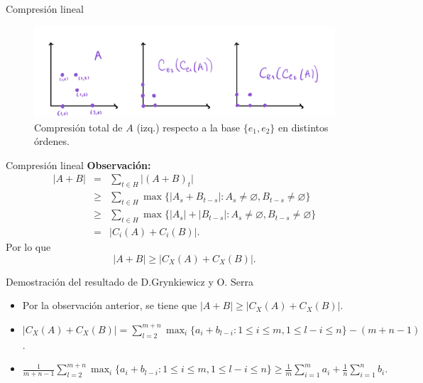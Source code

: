 \documentclass{beamer}
\begin{document}
\begin{frame}{Compresión lineal}
    \begin{figure}
        \centering
        \includegraphics[scale=0.16]{pics/compresion2.jpeg}
        \caption{Compresión total de $A$ (izq.) respecto a la base $\{e_1, e_2\}$ en distintos órdenes.}
      
    \end{figure}
\end{frame}

\begin{frame}{Compresión lineal}
\textbf{Observación:} 
    \begin{eqnarray*}
    \lvert A + B \rvert &=& \sum_{t \in H} \lvert (A + B)_t \rvert\\
    &\geq& \sum_{t\in H} \max\{\lvert A_s + B_{t-s}\rvert: A_s \neq \varnothing, B_{t-s} \neq \varnothing\}\\
    &\geq& \sum_{t\in H} \max \{\lvert A_s \rvert + \lvert B_{t-s}\rvert: A_s \neq \varnothing, B_{t-s} \neq \varnothing \} \\
    &=& \lvert C_i(A) + C_i(B) \rvert.
    \end{eqnarray*}
    Por lo que 
    $$\lvert A + B \rvert \geq \lvert C_X(A) + C_X(B) \rvert.$$
\end{frame}


\begin{frame}{Demostración del resultado de D.Grynkiewicz y O. Serra}
    \begin{itemize}
        \item Por la observación anterior, se tiene que $\lvert A + B \rvert \geq \lvert C_X(A) + C_X(B) \rvert.$
        \item $\lvert C_X(A) + C_X(B) \rvert = \sum_{l=2}^{m+n} \max_{i}\{a_i + b_{l-i}: 1 \leq i \leq m, 1 \leq l-i \leq n\} - (m+n-1)$.
        \item $\frac{1}{m+n-1} \sum_{l=2}^{m+n} \max_{i}\{a_i + b_{l-i}: 1 \leq i \leq m, 1 \leq l-i \leq n\} \geq \frac{1}{m}\sum_{i=1}^m a_i + \frac{1}{n} \sum_{i=1}^n b_i.$
    \end{itemize}
\end{frame}
\end{document}
